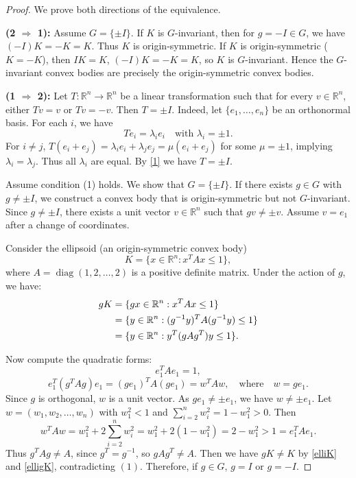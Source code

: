 \documentclass[12pt, reqno]{amsart}
\theoremstyle{definition}
\theoremstyle{remark}
\numberwithin{equation}{section}
\begin{document}
	\begin{proof}
		We prove both directions of the equivalence.
		
		\noindent\textbf{(2 $\Rightarrow$ 1):} 
		Assume $G = \{\pm I\}$. 
		If $K$ is $G$-invariant, then for $g = -I \in G$, we have $(-I)K = -K = K$. 
			Thus $K$ is origin-symmetric.
		 If $K$ is origin-symmetric ($K = -K$), then
				$IK = K$, 
				$(-I)K = -K = K$,
			so $K$ is $G$-invariant.
		Hence the $G$-invariant convex bodies are precisely the origin-symmetric convex bodies.
		
		\noindent\textbf{(1 $\Rightarrow$ 2):} 
		Let $T: \mathbb{R}^n \to \mathbb{R}^n$ be a linear transformation such that for every $v \in \mathbb{R}^n$, either $Tv = v$ or $Tv = -v$. Then $T = \pm I$. Indeed, let $\{e_1,\ldots,e_n\}$ be an orthonormal basis. For each $i$, we have
		\begin{equation}\label{1}
			Te_i = \lambda_i e_i \quad \text{with } \lambda_i = \pm1.
		\end{equation}
	  For $i \neq j$, $T(e_{i}+e_{j})=\lambda_i e_i+\lambda_j e_j=\mu(e_{i}+e_{j})$
		for some $\mu = \pm 1$, implying $\lambda_i = \lambda_j$. Thus all $\lambda_i$ are equal. By \eqref{1} we have $T=\pm I$. 
	
		Assume condition (1) holds. We show that $G = \{\pm I\}$.
	If there exists $g \in G$ with $g \neq \pm I$,  we construct a convex body that is origin-symmetric but not $G$-invariant.
		Since $g \neq \pm I$, there exists a unit vector $v \in \mathbb{R}^n$ such that $gv \neq \pm v$. 
		Assume $v = e_1$ after a change of coordinates.
		
		Consider the ellipsoid (an origin-symmetric convex body)
		\begin{equation}\label{elliK}
		K = \{ x \in \mathbb{R}^n : x^T A x \leq 1 \},
		\end{equation}
		where $A = \operatorname{diag}(1, 2, \dots, 2)$ is a positive definite matrix. 
		Under the action of $g$, we have:
		\begin{align}\label{elligK}
		gK &= \{ gx \in \mathbb{R}^n : x^T A x \leq 1 \}\notag\\
		&=\{ y \in \mathbb{R}^n : (g^{-1}y)^T A (g^{-1}y) \leq 1 \}\notag\\
		&=\{ y \in \mathbb{R}^n : y^T (g A g^T) y \leq 1 \}.
		\end{align}
		
		Now compute the quadratic forms:
		\[
		e_1^T A e_1 = 1,
		\]
		\[
		e_1^T (g^{T} A g) e_1 = (g e_1)^T A (g e_1) = w^T A w, \quad \text{where} \quad w = g e_1.
		\]
		Since $g$ is orthogonal, $w$ is a unit vector. As $g e_1 \neq \pm e_1$, we have $w \neq \pm e_1$. 
	Let $w = (w_1, w_2, \dots, w_n)$ with $w_1^2 < 1$ and $\sum_{i=2}^n w_i^2 = 1 - w_1^2 > 0$. Then
		\[
		w^T A w =  w_1^2 + 2 \sum_{i=2}^n w_i^2 =  w_1^2 + 2 (1 - w_1^2)=2 - w_1^2 > 1  = e_1^T A e_1.
		\]
	 Thus $g^{T} A g \neq A$, since $g^{T}=g^{-1}$, so $g A g^{T} \neq A$. Then we have  $gK \neq K$ by \eqref{elliK} and \eqref{elligK}, contradicting 
	 $(1)$.
		Therefore, if $g\in G$, $g =  I$ or $g=-I$.
		

\end{proof}
\end{document}
